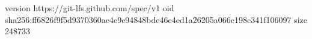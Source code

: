 version https://git-lfs.github.com/spec/v1
oid sha256:ff6826f9f5d9370360ae4e9e94848bde46e4ed1a26205a066c198c341f106097
size 248733
